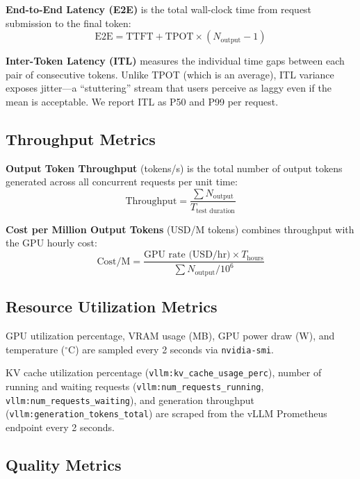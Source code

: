 \documentclass[a4paper,12pt]{report}
\begin{document}
\textbf{End-to-End Latency (E2E)} is the total wall-clock time from request submission to the final token:
\begin{equation}
\text{E2E} = \text{TTFT} + \text{TPOT} \times (N_{\text{output}} - 1)
\end{equation}

\textbf{Inter-Token Latency (ITL)} measures the individual time gaps between each pair of consecutive tokens. Unlike TPOT (which is an average), ITL variance exposes jitter---a ``stuttering'' stream that users perceive as laggy even if the mean is acceptable. We report ITL as P50 and P99 per request.

\subsection{Throughput Metrics}

\textbf{Output Token Throughput} (tokens/s) is the total number of output tokens generated across all concurrent requests per unit time:
\begin{equation}
\text{Throughput} = \frac{\sum N_{\text{output}}}{T_{\text{test duration}}}
\end{equation}

\textbf{Cost per Million Output Tokens} (USD/M tokens) combines throughput with the GPU hourly cost:
\begin{equation}
\text{Cost/M} = \frac{\text{GPU rate (USD/hr)} \times T_{\text{hours}}}{\sum N_{\text{output}} / 10^6}
\end{equation}

\subsection{Resource Utilization Metrics}

GPU utilization percentage, VRAM usage (MB), GPU power draw (W), and temperature ($^\circ$C) are sampled every 2 seconds via \texttt{nvidia-smi}.

KV cache utilization percentage (\texttt{vllm:kv\_cache\_usage\_perc}), number of running and waiting requests (\texttt{vllm:num\_requests\_running}, \texttt{vllm:num\_requests\_waiting}), and generation throughput (\texttt{vllm:generation\_tokens\_total}) are scraped from the vLLM Prometheus endpoint every 2 seconds.

\subsection{Quality Metrics}
\end{document}
